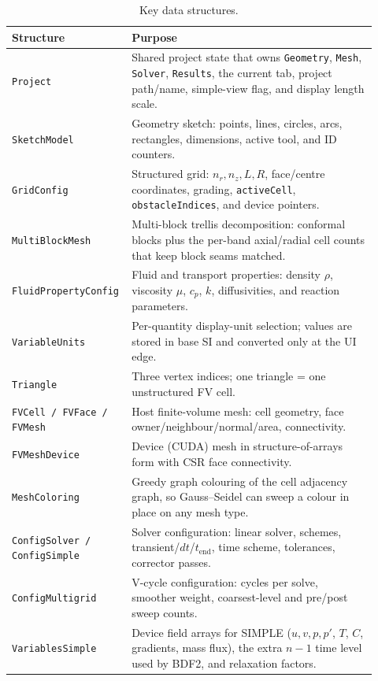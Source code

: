 \documentclass[11pt]{article}
\begin{document}
\begin{table}[h]
\centering
\caption{Key data structures.}
\label{tab:structs}
\begin{tabular}{@{}>{\raggedright\arraybackslash}p{0.26\linewidth}
                   >{\raggedright\arraybackslash}p{0.66\linewidth}@{}}
\toprule
\textbf{Structure} & \textbf{Purpose} \\
\midrule
\texttt{Project} & Shared project state that owns \texttt{Geometry}, \texttt{Mesh}, \texttt{Solver}, \texttt{Results}, the current tab, project path/name, simple-view flag, and display length scale. \\
\texttt{SketchModel} & Geometry sketch: points, lines, circles, arcs, rectangles, dimensions, active tool, and ID counters. \\
\texttt{GridConfig} & Structured grid: $n_r, n_z, L, R$, face/centre coordinates, grading, \texttt{activeCell}, \texttt{obstacleIndices}, and device pointers. \\
\texttt{MultiBlockMesh} & Multi-block trellis decomposition: conformal blocks plus the per-band axial/radial cell counts that keep block seams matched. \\
\texttt{FluidPropertyConfig} & Fluid and transport properties: density $\rho$, viscosity $\mu$, $c_p$, $k$, diffusivities, and reaction parameters. \\
\texttt{VariableUnits} & Per-quantity display-unit selection; values are stored in base SI and converted only at the UI edge. \\
\texttt{Triangle} & Three vertex indices; one triangle = one unstructured FV cell. \\
\texttt{FVCell / FVFace / FVMesh} & Host finite-volume mesh: cell geometry, face owner/neighbour/normal/area, connectivity. \\
\texttt{FVMeshDevice} & Device (CUDA) mesh in structure-of-arrays form with CSR face connectivity. \\
\texttt{MeshColoring} & Greedy graph colouring of the cell adjacency graph, so Gauss--Seidel can sweep a colour in place on any mesh type. \\
\texttt{ConfigSolver / ConfigSimple} & Solver configuration: linear solver, schemes, transient/$dt$/$t_{\text{end}}$, time scheme, tolerances, corrector passes. \\
\texttt{ConfigMultigrid} & V-cycle configuration: cycles per solve, smoother weight, coarsest-level and pre/post sweep counts. \\
\texttt{VariablesSimple} & Device field arrays for SIMPLE ($u, v, p, p'$, $T$, $C$, gradients, mass flux), the extra $n-1$ time level used by BDF2, and relaxation factors. \\

\end{tabular}
\end{table}
\end{document}
